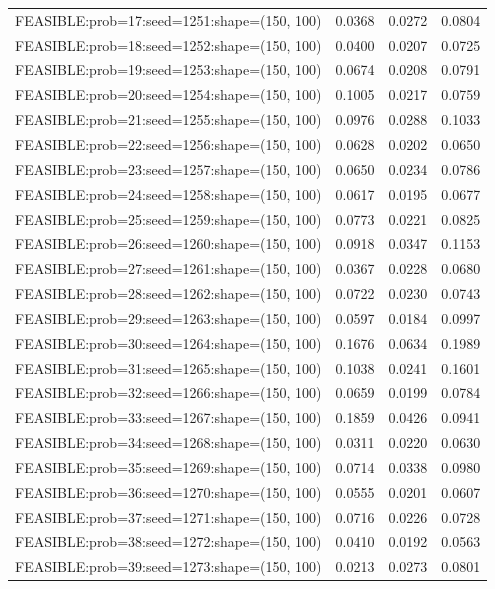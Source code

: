 \begin{longtable}{lccc}
FEASIBLE:prob=17:seed=1251:shape=(150, 100)  & 0.0368 & 0.0272 & 0.0804 \\
FEASIBLE:prob=18:seed=1252:shape=(150, 100)  & 0.0400 & 0.0207 & 0.0725 \\
FEASIBLE:prob=19:seed=1253:shape=(150, 100)  & 0.0674 & 0.0208 & 0.0791 \\
FEASIBLE:prob=20:seed=1254:shape=(150, 100)  & 0.1005 & 0.0217 & 0.0759 \\
FEASIBLE:prob=21:seed=1255:shape=(150, 100)  & 0.0976 & 0.0288 & 0.1033 \\
FEASIBLE:prob=22:seed=1256:shape=(150, 100)  & 0.0628 & 0.0202 & 0.0650 \\
FEASIBLE:prob=23:seed=1257:shape=(150, 100)  & 0.0650 & 0.0234 & 0.0786 \\
FEASIBLE:prob=24:seed=1258:shape=(150, 100)  & 0.0617 & 0.0195 & 0.0677 \\
FEASIBLE:prob=25:seed=1259:shape=(150, 100)  & 0.0773 & 0.0221 & 0.0825 \\
FEASIBLE:prob=26:seed=1260:shape=(150, 100)  & 0.0918 & 0.0347 & 0.1153 \\
FEASIBLE:prob=27:seed=1261:shape=(150, 100)  & 0.0367 & 0.0228 & 0.0680 \\
FEASIBLE:prob=28:seed=1262:shape=(150, 100)  & 0.0722 & 0.0230 & 0.0743 \\
FEASIBLE:prob=29:seed=1263:shape=(150, 100)  & 0.0597 & 0.0184 & 0.0997 \\
FEASIBLE:prob=30:seed=1264:shape=(150, 100)  & 0.1676 & 0.0634 & 0.1989 \\
FEASIBLE:prob=31:seed=1265:shape=(150, 100)  & 0.1038 & 0.0241 & 0.1601 \\
FEASIBLE:prob=32:seed=1266:shape=(150, 100)  & 0.0659 & 0.0199 & 0.0784 \\
FEASIBLE:prob=33:seed=1267:shape=(150, 100)  & 0.1859 & 0.0426 & 0.0941 \\
FEASIBLE:prob=34:seed=1268:shape=(150, 100)  & 0.0311 & 0.0220 & 0.0630 \\
FEASIBLE:prob=35:seed=1269:shape=(150, 100)  & 0.0714 & 0.0338 & 0.0980 \\
FEASIBLE:prob=36:seed=1270:shape=(150, 100)  & 0.0555 & 0.0201 & 0.0607 \\
FEASIBLE:prob=37:seed=1271:shape=(150, 100)  & 0.0716 & 0.0226 & 0.0728 \\
FEASIBLE:prob=38:seed=1272:shape=(150, 100)  & 0.0410 & 0.0192 & 0.0563 \\
FEASIBLE:prob=39:seed=1273:shape=(150, 100)  & 0.0213 & 0.0273 & 0.0801 \\

\end{longtable}
